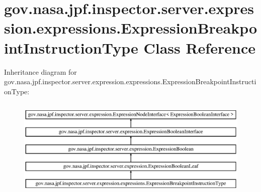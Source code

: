 \hypertarget{classgov_1_1nasa_1_1jpf_1_1inspector_1_1server_1_1expression_1_1expressions_1_1_expression_breakpoint_instruction_type}{}\section{gov.\+nasa.\+jpf.\+inspector.\+server.\+expression.\+expressions.\+Expression\+Breakpoint\+Instruction\+Type Class Reference}
\label{classgov_1_1nasa_1_1jpf_1_1inspector_1_1server_1_1expression_1_1expressions_1_1_expression_breakpoint_instruction_type}
Inheritance diagram for gov.\+nasa.\+jpf.\+inspector.\+server.\+expression.\+expressions.\+Expression\+Breakpoint\+Instruction\+Type\+:\begin{figure}[H]
\begin{center}
\leavevmode
\includegraphics[height=4.827586cm]{classgov_1_1nasa_1_1jpf_1_1inspector_1_1server_1_1expression_1_1expressions_1_1_expression_breakpoint_instruction_type}
\end{center}
\end{figure}
